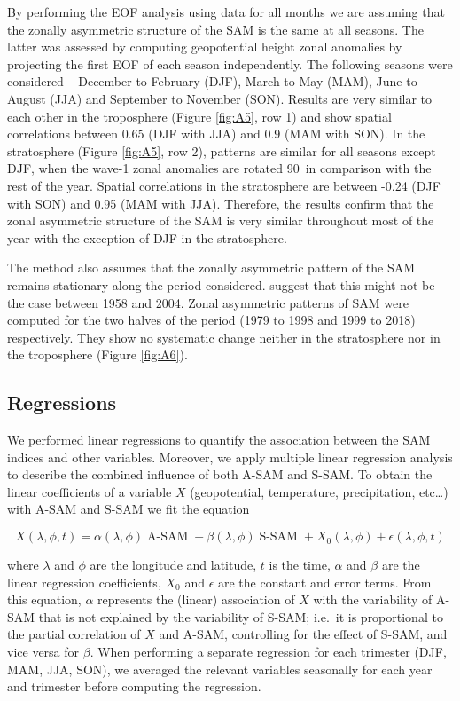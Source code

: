 \documentclass[smallextended]{svjour3}       %
\begin{document}
By performing the EOF analysis using data for all months we are assuming that the zonally asymmetric structure of the SAM is the same at all seasons. The latter was assessed by computing geopotential height zonal anomalies by projecting the first EOF of each season independently. The following seasons were considered -- December to February (DJF), March to May (MAM), June to August (JJA) and September to November (SON). Results are very similar to each other in the troposphere (Figure \ref{fig:A5}, row 1) and show spatial correlations between 0.65 (DJF with JJA) and 0.9 (MAM with SON). In the stratosphere (Figure \ref{fig:A5}, row 2), patterns are similar for all seasons except DJF, when the wave-1 zonal anomalies are rotated 90\degree~in comparison with the rest of the year. Spatial correlations in the stratosphere are between -0.24 (DJF with SON) and 0.95 (MAM with JJA). Therefore, the results confirm that the zonal asymmetric structure of the SAM is very similar throughout most of the year with the exception of DJF in the stratosphere.

The method also assumes that the zonally asymmetric pattern of the SAM remains stationary along the period considered. \citet{silvestri2009} suggest that this might not be the case between 1958 and 2004. Zonal asymmetric patterns of SAM were computed for the two halves of the period (1979 to 1998 and 1999 to 2018) respectively. They show no systematic change neither in the stratosphere nor in the troposphere (Figure \ref{fig:A6}).

\hypertarget{regressions}{%
\subsection{Regressions}\label{regressions}}

We performed linear regressions to quantify the association between the SAM indices and other variables. Moreover, we apply multiple linear regression analysis to describe the combined influence of both A\nobreakdash-SAM and S\nobreakdash-SAM. To obtain the linear coefficients of a variable \(X\) (geopotential, temperature, precipitation, etc\ldots{}) with A\nobreakdash-SAM and S\nobreakdash-SAM we fit the equation

\[
X(\lambda, \phi, t) = \alpha(\lambda, \phi) \operatorname{A-SAM} + \beta(\lambda, \phi) \operatorname{S-SAM} + X_0(\lambda, \phi) +  \epsilon(\lambda, \phi, t)
\]

where \(\lambda\) and \(\phi\) are the longitude and latitude, \(t\) is the time, \(\alpha\) and \(\beta\) are the linear regression coefficients, \(X_0\) and \(\epsilon\) are the constant and error terms. From this equation, \(\alpha\) represents the (linear) association of \(X\) with the variability of A\nobreakdash-SAM that is not explained by the variability of S\nobreakdash-SAM; i.e.~it is proportional to the partial correlation of \(X\) and A\nobreakdash-SAM, controlling for the effect of S\nobreakdash-SAM, and vice versa for \(\beta\). When performing a separate regression for each trimester (DJF, MAM, JJA, SON), we averaged the relevant variables seasonally for each year and trimester before computing the regression.
\end{document}
